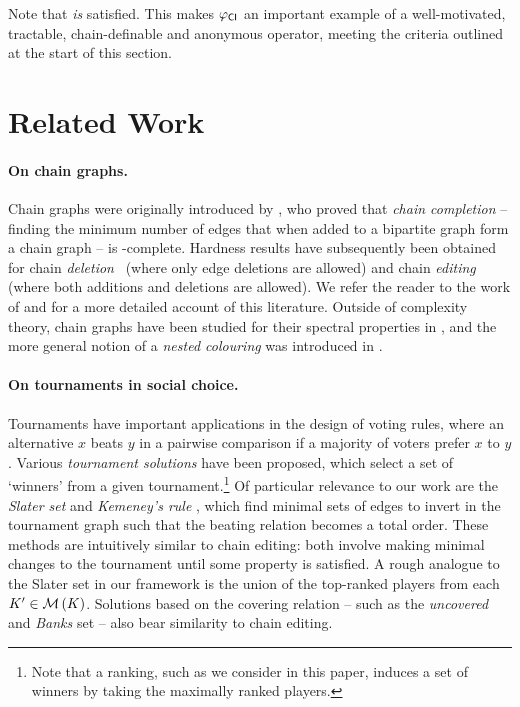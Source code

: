 Note that  \emph{is} satisfied. This makes ${\varphi_{\mathsf{CI}}}$ an
important example of a well-motivated, tractable, chain-definable
and anonymous operator, meeting the criteria outlined at the start of
this section.

\section{Related Work}
\label{tourn_sec_related_work}

\paragraph{On chain graphs.}
%
Chain graphs were originally introduced by \textcite{yannakakis1981computing}, who
proved that \emph{chain completion} -- finding the minimum number of edges that
when added to a bipartite graph form a chain graph -- is
-complete. Hardness results have subsequently been obtained
for chain \emph{deletion}~\cite{natanzon2001complexity} (where only edge
deletions are allowed) and chain \emph{editing}~\cite{drange2015threshold}
(where both additions and deletions are allowed). We refer the reader to the
work of \textcite{jiao2017algorithms} and \textcite{drange2015threshold} for a more
detailed account of this literature.
%
Outside of complexity theory, chain graphs have been studied for their spectral
properties in \cite{andelic_2015,ghorbani2017spectral}, and the more general
notion of a \emph{nested colouring} was introduced in \cite{cook2015nested}.

\paragraph{On tournaments in social choice.}
%
Tournaments have important applications in the design of voting rules, where an
alternative $x$ beats $y$ in a pairwise comparison if a majority of voters
prefer $x$ to $y$.  Various \emph{tournament solutions} have been proposed,
which select a set of `winners' from a given tournament.\footnote{Note that a
ranking, such as we consider in this paper, induces a set of winners by taking
the maximally ranked players.}
%
Of particular relevance to our work are the \emph{Slater set} and
\emph{Kemeney's rule} \cite{brandt2016a}, which find minimal sets of edges to
invert in the tournament graph such that the beating relation becomes a total
order.\footnotemark{}
These methods are intuitively similar to chain editing: both
involve making minimal changes to the tournament until some property is
satisfied. A rough analogue to the Slater set in our framework is the union of
the top-ranked players from each $K' \in \operatorname{\mathcal{M}}\left({K}\right)$. Solutions based on the
covering relation -- such as the \emph{uncovered} and \emph{Banks} set
\cite{brandt2016a} -- also bear similarity to chain editing.

